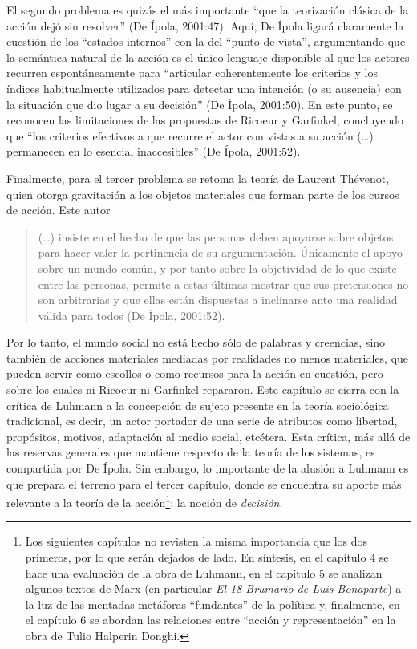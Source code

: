 El segundo problema es quizás el más importante ``que la teorización clásica de la acción dejó sin resolver'' (De Ípola, 2001:47). Aquí, De Ípola ligará claramente la cuestión de los ``estados internos'' con la del ``punto de vista'', argumentando que la semántica natural de la acción es el único lenguaje disponible al que los actores recurren espontáneamente para ``articular coherentemente los criterios y los índices habitualmente utilizados para detectar una intención (o su ausencia) con la situación que dio lugar a su decisión'' (De Ípola, 2001:50). En este punto, se reconocen las limitaciones de las propuestas de Ricoeur y Garfinkel, concluyendo que ``los criterios efectivos a que recurre el actor con vistas a su acción (\ldots) permanecen en lo esencial inaccesibles'' (De Ípola, 2001:52).

Finalmente, para el tercer problema se retoma la teoría de Laurent Thévenot, quien otorga gravitación a los objetos materiales que forman parte de los cursos de acción. Este autor

\begin{quote}
(\ldots) insiste en el hecho de que las personas deben apoyarse sobre objetos para hacer valer la pertinencia de su argumentación. Únicamente el apoyo sobre un mundo común, y por tanto sobre la objetividad de lo que existe entre las personas, permite a estas últimas mostrar que sus pretensiones no son arbitrarias y que ellas están dispuestas a inclinarse ante una realidad válida para todos (De Ípola, 2001:52).
\end{quote}

Por lo tanto, el mundo social no está hecho sólo de palabras y creencias, sino también de acciones materiales mediadas por realidades no menos materiales, que pueden servir como escollos o como recursos para la acción en cuestión, pero sobre los cuales ni Ricoeur ni Garfinkel repararon. Este capítulo se cierra con la crítica de Luhmann a la concepción de sujeto presente en la teoría sociológica tradicional, es decir, un actor portador de una serie de atributos como libertad, propósitos, motivos, adaptación al medio social, etcétera. Esta crítica, más allá de las reservas generales que mantiene respecto de la teoría de los sistemas, es compartida por De Ípola. Sin embargo, lo importante de la alusión a Luhmann es que prepara el terreno para el tercer capítulo, donde se encuentra su aporte más relevante a la teoría de la acción\footnote{Los siguientes capítulos no revisten la misma importancia que los dos primeros, por lo que serán dejados de lado. En síntesis, en el capítulo 4 se hace una evaluación de la obra de Luhmann, en el capítulo 5 se analizan algunos textos de Marx (en particular \emph{El 18 Brumario de Luis Bonaparte}) a la luz de las mentadas metáforas ``fundantes'' de la política y, finalmente, en el capítulo 6 se abordan las relaciones entre ``acción y representación'' en la obra de Tulio Halperin Donghi.}: la noción de \emph{decisión}.

